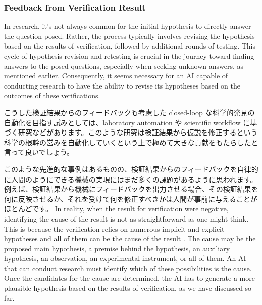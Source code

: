 
\subsubsection{Feedback from Verification Result}

In research, it's not always common for the initial hypothesis to directly answer the question posed. Rather, the process typically involves revising the hypothesis based on the results of verification, followed by additional rounds of testing. This cycle of hypothesis revision and retesting is crucial in the journey toward finding answers to the posed questions, especially when seeking unknown answers, as mentioned earlier. Consequently, it seems necessary for an AI capable of conducting research to have the ability to revise its hypotheses based on the outcomes of these verifications.

こうした検証結果からのフィードバックも考慮した closed-loop な科学的発見の自動化を目指す試みとしては、laboratory automation \cite{king2004functional} や scientific workflow \cite{gil2022will} に基づく研究などがあります。このような研究は検証結果から仮説を修正するという科学の根幹の営みを自動化していくという上で極めて大きな貢献をもたらしたと言って良いでしょう。

このような先進的な事例はあるものの、検証結果からのフィードバックを自律的に人間のようにできる機械の実現にはまだ多くの課題があるように思われます。例えば、検証結果から機械にフィードバックを出力させる場合、その検証結果を何に反映させるか、それを受けて何を修正すべきかは人間が事前に与えることがほとんどです。 In reality, when the result for verification were negative, identifying the cause of the result is not as straightforward as one might think. This is because the verification relies on numerous implicit and explicit hypotheses and all of them can be the cause of the result \cite{sep-scientific-underdetermination}. The cause may be the proposed main hypothesis, a premise behind the hypothesis, an auxiliary hypothesis, an observation, an experimental instrument, or all of them. An AI that can conduct research must identify which of these possibilities is the cause. Once the candidates for the cause are determined, the AI has to generate a more plausible hypothesis based on the results of verification, as we have discussed so far.

